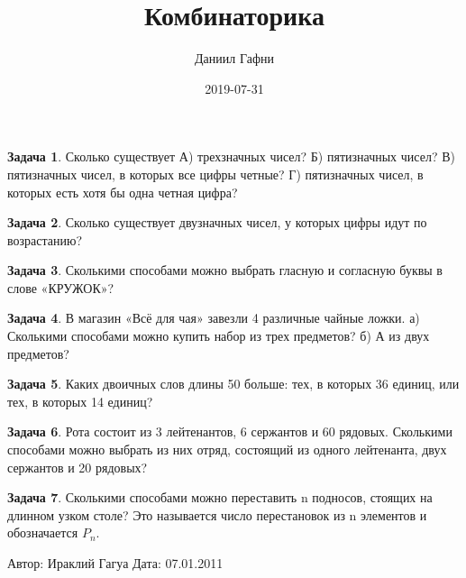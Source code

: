 \documentclass[a4paper,11pt]{article}%
\title{Комбинаторика}%
\author{Даниил Гафни}%
\date{2019{-}07{-}31}%
\theoremstyle{definition}%
\newtheorem{Ex}{\hspace{-25pt}\fbox{\phantom{123}} Задача}%
\begin{document}
%
\normalsize%
\maketitle%
\begin{Ex}%
Сколько существует
А) трехзначных чисел?
Б) пятизначных чисел?
В) пятизначных чисел, в которых все цифры четные?
Г) пятизначных чисел, в которых есть хотя бы одна четная цифра?%
%
\end{Ex}%
%
\iffalse%
Автор: Ираклий Гагуа%
Дата: 07.01.2011%
Название: None%
Подсказка: \textbackslash{}\textbackslash{}%
nan%
\fi%
%
\begin{Ex}%
Сколько существует двузначных чисел, у которых цифры идут по возрастанию?%
%
\end{Ex}%
%
\iffalse%
Автор: Ираклий Гагуа%
Дата: 07.01.2011%
Название: None%
Подсказка: \textbackslash{}\textbackslash{}%
nan%
\fi%
%
\begin{Ex}%
Сколькими способами можно выбрать гласную и согласную буквы в слове «КРУЖОК»?%
%
\end{Ex}%
%
\iffalse%
Автор: Ираклий Гагуа%
Дата: 07.01.2011%
Название: None%
Подсказка: \textbackslash{}\textbackslash{}%
nan%
\fi%
%
\begin{Ex}%
В магазин «Всё для чая» завезли 4 различные чайные ложки.
а) Сколькими способами можно купить набор из трех предметов?
б) А из двух предметов?%
%
\end{Ex}%
%
\iffalse%
Автор: Ираклий Гагуа%
Дата: 07.01.2011%
Название: None%
Подсказка: \textbackslash{}\textbackslash{}%
nan%
\fi%
%
\begin{Ex}%
Каких двоичных слов длины 50 больше: тех, в которых 36 единиц, или тех, в которых 14 единиц?%
%
\end{Ex}%
%
\iffalse%
Автор: Ираклий Гагуа%
Дата: 07.01.2011%
Название: None%
Подсказка: \textbackslash{}\textbackslash{}%
nan%
\fi%
%
\begin{Ex}%
Рота состоит из 3 лейтенантов, 6 сержантов и 60 рядовых. Сколькими способами
можно выбрать из них отряд, состоящий из одного лейтенанта, двух сержантов и 20
рядовых?%
%
\end{Ex}%
%
\iffalse%
Автор: 25 школа%
Дата: 01.07.2017%
Название: None%
Подсказка: \textbackslash{}\textbackslash{}%
nan%
\fi%
%
\begin{Ex}%
Сколькими способами можно переставить n подносов, стоящих на длинном узком столе? Это называется число перестановок из n элементов и обозначается $P_n$.%
%
\end{Ex}%
%
\iffalse%
Автор: Ираклий Гагуа%
Дата: 07.01.2011%
\end{document}
